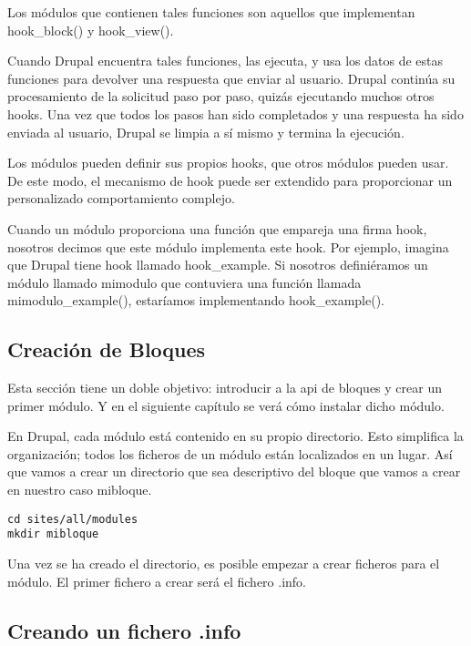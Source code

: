 \documentclass[11pt]{article}
\begin{document}
Los módulos que contienen tales funciones son aquellos que implementan
hook\_block() y hook\_view().

Cuando Drupal encuentra tales funciones, las ejecuta, y usa los datos
de estas funciones para devolver una respuesta que enviar al
usuario. Drupal continúa su procesamiento de la solicitud paso por
paso, quizás ejecutando muchos otros hooks. Una vez que todos los
pasos han sido completados y una respuesta ha sido enviada al usuario,
Drupal se limpia a sí mismo y termina la ejecución.

Los módulos pueden definir sus propios hooks, que otros módulos pueden
usar. De este modo, el mecanismo de hook puede ser extendido para
proporcionar un personalizado comportamiento complejo.

Cuando un módulo proporciona una función que empareja una firma hook,
nosotros decimos que este módulo implementa este hook. Por ejemplo,
imagina que Drupal tiene hook llamado hook\_example. Si nosotros
definiéramos un módulo llamado mimodulo que contuviera una función
llamada mimodulo\_example(), estaríamos implementando hook\_example().

\subsection{Creación de Bloques}
\label{sec-2.4}


Esta sección tiene un doble objetivo: introducir a la api de bloques y
crear un primer módulo. Y en el siguiente capítulo se verá cómo
instalar dicho módulo.

En Drupal, cada módulo está contenido en su propio directorio. Esto
simplifica la organización; todos los ficheros de un módulo están
localizados en un lugar. Así que vamos a crear un directorio que sea
descriptivo del bloque que vamos a crear en nuestro caso mibloque.


\begin{verbatim}
cd sites/all/modules
mkdir mibloque
\end{verbatim}



Una vez se ha creado el directorio, es posible empezar a crear
ficheros para el módulo. El primer fichero a crear será el fichero
.info.

\subsection{Creando un fichero .info}
\label{sec-2.5}
\end{document}
